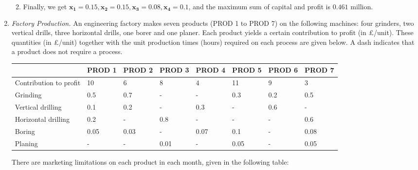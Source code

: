 \documentclass[12pt,a4paper]{article}
\makeatletter
\newtheorem*{solution}{Solution}
\theoremstyle{definition}
\renewenvironment{solution}[1][Solution] {\par\pushQED{\qed}\normalfont\topsep6\p@\@plus6\p@\relax\trivlist\item[\hskip\labelsep\bfseries#1\@addpunct{.}]\ignorespaces}{\popQED\endtrivlist\@endpefalse} \makeatother
\makeatother
\begin{document}
\begin{enumerate}
\begin{enumerate}
\begin{solution}
\begin{enumerate}
    \end{enumerate}
    Finally, we get $\mathbf{x_1 = 0.15, x_2=0.15,x_3=0.08,x_4=0.1}$, and the maximum sum of capital and profit is $\mathbf{0.461}$ million.
    \end{solution}
    \end{enumerate}
    \item
    \textit{Factory Production.} An engineering factory makes seven products (PROD 1 to PROD 7) on the following machines: four grinders, two vertical drills, three horizontal drills, one borer and one planer. Each product yields a certain contribution to profit (in \pounds/unit). These quantities (in \pounds/unit) together with the unit production times (hours) required on each process are given below. A dash indicates that a product does not require a process.

    \begin{table}[htbp]
      \scriptsize
      \centering
      \renewcommand\arraystretch{1.1}
      \begin{tabular}{m{} m{}<{\centering} m{}<{\centering} m{}<{\centering} m{}<{\centering} m{}<{\centering} m{}<{\centering} m{}<{\centering}}
      \hline
       & \textbf{PROD 1} & \textbf{PROD 2} & \textbf{PROD 3} & \textbf{PROD 4} & \textbf{PROD 5} & \textbf{PROD 6} &  \textbf{PROD 7} \\\hline
      Contribution to profit & 10 & 6 & 8 & 4 & 11 & 9 & 3 \\
      Grinding & 0.5 & 0.7 & - & - & 0.3 & 0.2 & 0.5 \\
      Vertical drilling & 0.1 & 0.2 & - & 0.3 & - & 0.6 & - \\
      Horizontal drilling & 0.2 & - & 0.8 & - & - & - & 0.6 \\
      Boring & 0.05 & 0.03 & - & 0.07 & 0.1 & - & 0.08 \\
      Planing & - & - & 0.01 & - & 0.05 & - & 0.05 \\
      \hline
      \end{tabular}
    \end{table}

    There are marketing limitations on each product in each month, given in the following table:


\end{enumerate}
\end{document}
